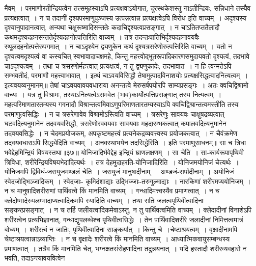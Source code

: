 मैवम्~। परमाणोरतीन्द्रियत्वेन तत्समूहस्याऽपि प्रत्यक्षवाऽयोगात्, दूरस्थकेशस्तु नाऽतीन्द्रियः, सन्निधाने तस्यैेव प्रत्यक्षत्वात्~। न च तदानीं दृश्यपरमाणुपुञ्जस्य
उत्पन्नत्वान्न प्रत्यक्षत्वेऽपि विरोध इति वाच्यम्~। अदृश्यस्य दृश्यानुपादानत्वात्, अन्यथा चक्षुरूष्मादिसन्ततेः कदाचिद्दृश्यत्वप्रसङ्गात्~। न चाऽतितप्ततैलादौ
कथमदृश्यदहनसन्ततेर्दृश्यदहनोत्पत्तिरिति वाच्यम्~। तत्र तदन्तःपातिभिर्दृश्यदहनावयवैः स्थूलदहनोत्पत्तेरुपगमात्~। न चाऽदृश्येन द्व्यणुकेन कथं दृश्यत्रसरेणोरुत्पत्तिरिति
वाच्यम्~। यतो न दृश्यत्वमदृश्यत्वं वा कस्यचित् स्वभावादाचक्षमहे, किन्तु महत्त्वोद्भूतरूपादिकारणसमुदायवतो दृश्यत्वं, तदभावे चाऽदृश्यत्वम्~। तथा च त्रसरणोर्महत्त्वात्
प्रत्यक्षत्वं, न तु द्व्यणुकादेः, तदभावात~। न हि त्वन्मतेऽपि सम्भवतीदं, परमाणौ महत्त्वाभावात्~।
इत्थं चाऽवयविसिद्धौ तेषामुत्पादविनाशयोः प्रत्यक्षसिद्धत्वादनित्यत्वम्~। इत्यवयव्यनुमानम्॥
तेषां चाऽवयवावयवधाराया अनन्तत्वे मेरुसर्षपयोरपि साम्यप्रसङ्गः~। अतः क्वचिद्विश्रामो वाच्यः~। यत्र तु विश्रामः, तस्याऽनित्यत्वेऽसमवेत
(भाव)कार्योत्पत्तिप्रसङ्गात् तस्य नित्यत्वम्~। महत्परिमाणतारतम्यस्य गगनादौ विश्रान्तत्वमिवाऽणुपरिमाणतारतम्यस्याऽपि क्वचिद्विश्रान्तत्वमस्तीति तस्य परमाणुत्वसिद्धिः~।
न च त्रसरेणावेव विश्रामोऽस्त्विति वाच्यम्~। त्रसरेणुः सावयवः चाक्षुषद्रव्यत्वात् घटवदित्यनुमानेन तदवयवसिद्धौ, त्रसरेणोरववयवाः सावयवाः महदारम्भकत्वात्
कपालवदित्यनुमानेन तदवयवसिद्धेः~। न चेदमप्रयोजकम्, अपकृष्टमहत्त्वं प्रत्यनेकद्रव्यवत्त्वस्य प्रयोजकत्वात्~। न चैवंक्रमेण तदवयवधाराऽपि सिद्ध्येदिति वाच्यम्~।
अनवस्थाभयेन तदसिद्धेरिति~। इति परमाणुसाधनम्॥
सा च त्रिधा भवेद्देहमिन्द्रियं विषयस्तथा॥३७॥
योनिजादिर्भवेद्देह इन्द्रियं घ्राणलक्षणम्~।
सा चेति~। सा-कार्यरूपापृथिवी त्रिविधा, शरीरेन्द्रियविषयभेदादित्यर्थः~। तत्र देहमुदाहरति-योनिजादिरिति~। योनिजमयोनिजं चेत्यर्थः~।
योनिजमपि द्विविधं-जरायुजमण्डलं चेति~। जरायुजं मानुषादीनाम्~। अण्डजं-सर्पादीनाम्~। अयोनिजं स्वेदजोद्भिञ्जादिकम्~।
स्वेदजाः- कृमिदंशाद्याः उद्भिज्जाः-तरुगुल्माद्याः~। नारकिणां शरीरमप्ययोनिजम्~।
न च मानुषादिशरीराणां पार्थिवत्वे किं मानमिति वाच्यम्~। गन्धादिमत्त्वस्यैव प्रमाणत्वात्~। न च क्लेदोष्मादेरुपलम्भादाप्यत्वादिकमपि स्यादिति वाच्यम्~। तथा
सति जलत्वपृथिवीत्वादिना सङ्करप्रसङ्गात्~। न च तर्हि जलीयत्वादिकमेवाऽस्तु, न तु पार्थिवत्वमिति वाच्यम्~। क्लेदादीनां विनाशेऽपि शरीरत्वेन प्रत्यभिज्ञानात्,
गन्धाद्युपलब्धेश्च पृथिवीत्वसिद्धेः~। तेन पार्थिवादिशरीरे जलादीनां निमित्तत्वमात्रं बोध्यम्~।
शरीरत्वं न जातिः, पृथिवीत्वादिना साङ्कर्यात्~। किन्तु चे~।चेष्टाश्रयत्वम्~। वृक्षादीनामपि चेष्टाश्रयत्वान्नाऽव्याप्तिः~। न च वृक्षादेः शरीरत्वे किं मानमिति वाच्यम्~।
आध्यात्मिकवायुसम्बन्धस्य प्रमाणत्वात्~। तत्रैव किं मानमिति चेत्, भग्नक्षतसंरोहणादिना तदुन्नयनात्~। यदि हस्तादौ शरीरव्यवहारो न भवति, तदाऽन्त्यावयवित्वेन
